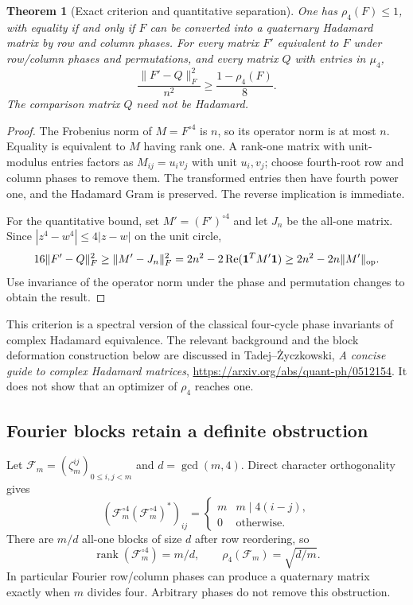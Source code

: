 \documentclass[11pt]{article}
\newtheorem{theorem}{Theorem}[section]
\begin{document}
\begin{theorem}[Exact criterion and quantitative separation]
\label{quat:phase-defect}
One has $\rho_4(F)\le1$, with equality if and only if $F$ can be
converted into a quaternary Hadamard matrix by row and column phases.
For every matrix $F'$ equivalent to $F$ under row/column phases and
permutations, and every matrix $Q$ with entries in $\mu_4$,
\[
              \frac{\|F'-Q\|_F^2}{n^2}
                    \ge\frac{1-\rho_4(F)}8.
\]
The comparison matrix $Q$ need not be Hadamard.
\end{theorem}
\begin{proof}
The Frobenius norm of $M=F^{\circ4}$ is $n$, so its operator norm
is at most $n$. Equality is equivalent to $M$ having rank one.
A rank-one matrix with unit-modulus entries factors as $M_{ij}=u_i v_j$
with unit $u_i,v_j$; choose fourth-root row and column phases to
remove them. The transformed entries then have fourth power one,
and the Hadamard Gram is preserved. The reverse implication is immediate.

For the quantitative bound, set $M'=(F')^{\circ4}$ and let $J_n$
be the all-one matrix. Since $|z^4-w^4|\le4|z-w|$ on the unit circle,
\[
 16\|F'-Q\|_F^2\ge\|M'-J_n\|_F^2
 =2n^2-2\operatorname{Re}(\mathbf1^TM'\mathbf1)
 \ge2n^2-2n\|M'\|_{\rm op}.
\]
Use invariance of the operator norm under the phase and permutation
changes to obtain the result.
\end{proof}

This criterion is a spectral version of the classical four-cycle
phase invariants of complex Hadamard equivalence. The relevant
background and the block deformation construction below are discussed
in Tadej--\.Zyczkowski, \emph{A concise guide to complex Hadamard matrices},
\url{https://arxiv.org/abs/quant-ph/0512154}.
It does not show that an optimizer of $\rho_4$ reaches one.

\subsection{Fourier blocks retain a definite obstruction}
Let $\mathcal F_m=(\zeta_m^{ij})_{0\le i,j<m}$ and $d=\gcd(m,4)$.
Direct character orthogonality gives
\[
 (\mathcal F_m^{\circ4}(\mathcal F_m^{\circ4})^*)_{ij}
 =\begin{cases}m&m\mid4(i-j),\\0&\text{otherwise}.\end{cases}
\]
There are $m/d$ all-one blocks of size $d$ after row reordering, so
\[
 \operatorname{rank}(\mathcal F_m^{\circ4})=m/d,\qquad
 \rho_4(\mathcal F_m)=\sqrt{d/m}.
\]
In particular Fourier row/column phases can produce a quaternary
matrix exactly when $m$ divides four. Arbitrary phases do not remove
this obstruction.
\end{document}
